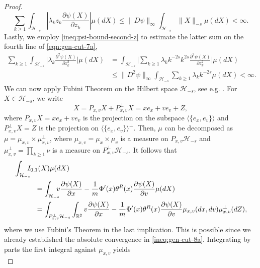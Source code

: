 \documentclass[11pt]{amsart}
\theoremstyle{definition}
\newcommand{\rbb}{\mathbb{R}}
\renewcommand{\H}{\mathcal{H}}
\newcommand{\la}{\langle}
\newcommand{\ra}{\rangle}
\theoremstyle{definition}
\theoremstyle{plain}
\numberwithin{equation}{section}
\begin{document}
\begin{proof}
\begin{equation}
\sum_{k\geq 1}\int_{\mathcal{H}_{-s}} \left|\lambda_kz_k\frac{\partial \psi(X)}{\partial z_k}\right|\mu(dX)\leq \| D\psi\|_\infty\int_{\mathcal{H}_{-s}}\!\!\!\!\|X\|_{-s}\mu(dX)<\infty.
\end{equation}
Lastly, we employ \eqref{ineq:psi-bound-second-z} to estimate the latter sum on the fourth line of \eqref{eqn:gen-cut-7a},
\begin{equation}\label{ineq:gen-cut-8e}
\begin{aligned}
\sum_{k\geq 1}\int_{\mathcal{H}_{-s}} \Big|\lambda_k\frac{\partial ^2\psi(X)}{\partial z_k^2}\Big|\mu(dX) &= \int_{\mathcal{H}_{-s}} \Big|\sum_{k\geq 1}\lambda_kk^{-2s}k^{2s}\frac{\partial ^2\psi(X)}{\partial z_k^2}\Big|\mu(dX)\\
&\leq \| D^2\psi\|_\infty \int_{\mathcal{H}_{-s}} \sum_{k\geq 1}\lambda_kk^{-2s}\mu(dX)<\infty.
\end{aligned}
\end{equation}
We can now apply Fubini Theorem on the Hilbert space $\H_{-s}$, see e.g. \cite{kuo2011integration}. For $X\in\H_{-s}$, we write  
\begin{equation*}
X=P_{x,v}X+P_{x,v}^\perp X=xe_x+ve_v+Z,
\end{equation*} 
where $P_{x,v}X=xe_x+ve_v$ is the projection on the subspace $\la\{e_x,e_v\}\ra$ and $P_{x,v}^\perp X=Z$ is the projection on $\la \{e_x,e_v\}\ra^\perp$. Then, $\mu$ can be decomposed as $\mu=\mu_{x,v}\times\mu_{x,v}^\perp$, where $\mu_{x,v}=\mu_x\times\mu_v$ is a measure on $P_{x,v}\H_{-s}$ and $\mu_{x,v}^\perp=\prod_{k\geq 1}\nu$ is a measure on $P_{x,v}^\perp\H_{-s}$. It follows that
\begin{equation}\label{eqn:density-8}
\begin{aligned}
\MoveEqLeft[3]
\int_{\mathcal{H}_{-s}}\!\!\!\!I_{0,1}(X)\mu(dX)\\
& = \int_{\mathcal{H}_{-s}}\!\!\!\!v\frac{\partial\psi(X)}{\partial x}-\frac{1}{m}\Phi'(x)\theta^R(x)\frac{\partial\psi(X)}{\partial v}\mu(dX)\\
&= \int_{P_{x,v}^\perp\H_{-s}}\int_{\rbb^2}v\frac{\partial\psi(X)}{\partial x}-\frac{1}{m}\Phi'(x)\theta^R(x)\frac{\partial\psi(X)}{\partial v}\mu_{x,v}(dx,dv)\mu_{ x,v}^\perp(dZ),
\end{aligned}
\end{equation}
where we use Fubini's Theorem in the last implication. This is possible since we already established the absolute convergence in \eqref{ineq:gen-cut-8a}. Integrating by parts the first integral against $\mu_{x,v}$ yields
\begin{equation}\label{eqn:density-8a}

\end{equation}
\end{proof}
\end{document}
